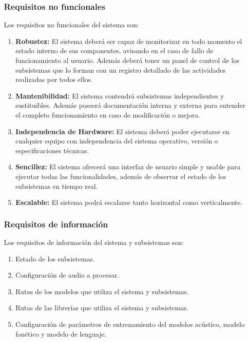 \documentclass[../main.tex]{subfiles}
\begin{document}
\subsubsection{Requisitos no funcionales}\label{subsubsec:req_nofuncionales}
Los requisitos no funcionales del sistema son:
\begin{enumerate}
    \item \textbf{Robustez:} El sistema deberá ser capaz de monitorizar en todo momento el estado interno de sus componentes, avisando en el caso de fallo de funcionamiento al usuario. 
    Además deberá tener un panel de control de los subsistemas que lo forman con un registro detallado de las actividades realizadas por todos ellos.
    \item \textbf{Mantenibilidad:} El sistema contendrá subsistemas independientes y sustituibles. 
    Además poseerá documentación interna y externa para entender el completo funcionamiento en caso de modificación o mejora.
    \item \textbf{Independencia de Hardware:} El sistema deberá poder ejecutarse en cualquier equipo con independencia del sistema operativo, versión o especificaciones técnicas.
    \item \textbf{Sencillez:} El sistema ofrecerá una interfaz de usuario simple y usable para ejecutar todas las funcionalidades, además de observar el estado de los subsistemas en tiempo real.
    \item \textbf{Escalable:} El sistema podrá escalarse tanto horizontal como verticalmente.
\end{enumerate}

\subsubsection{Requisitos de información}\label{subsubsec:req_informacion}
Los requisitos de información del sistema y subsistemas son:
\begin{enumerate}
    \item Estado de los subsistemas.
    \item Configuración de audio a procesar.
    \item Rutas de los modelos que utiliza el sistema y subsistemas.
    \item Rutas de las librerías que utiliza el sistema y subsistemas.
    \item Configuración de parámetros de entrenamiento del modelos acústico, modelo fonético y modelo de lenguaje.
\end{enumerate}
\end{document}
